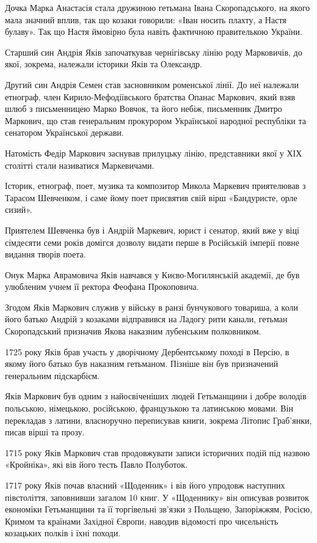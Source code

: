 Дочка Марка Анастасія стала дружиною гетьмана Івана Скоропадського, на якого
мала значний вплив, так що козаки говорили: «Іван носить плахту, а Настя
булаву». Так що Настя ймовірно була навіть фактичною правителькою України. 

Старший син Андрія Яків започаткував чернігівську лінію роду Марковичів, до
якої, зокрема, належали історики Яків та Олександр.

Другий син Андрія Семен став засновником роменської лінії. До неї належали
етнограф, член Кирило-Мефодіївського братства Опанас Маркович, який взяв шлюб з
письменницею Марко Вовчок, та його небіж, письменник Дмитро Маркович, що став
генеральним прокурором Української народної республіки та сенатором Української
держави.

Натомість Федір Маркович заснував прилуцьку лінію, представники якої у ХІХ
столітті стали називатися Маркевичами.

Історик, етнограф, поет, музика та композитор Микола Маркевич приятелював з
Тарасом Шевченком, і саме йому поет присвятив свій вірш «Бандуристе, орле
сизий».

Приятелем Шевченка був і Андрій Маркевич, юрист і сенатор, який вже у віці
сімдесяти семи років домігся дозволу видати перше в Російській імперії повне
видання творів поета.

Онук Марка Аврамовича Яків навчався у Києво-Могилянській академії, де був улюбленим учнем її ректора Феофана Прокоповича.

Згодом Яків Маркович служив у війську в ранзі бунчукового товариша, а коли його
батько Андрій з козаками відправився на Ладогу рити канали, гетьман
Скоропадський призначив Якова наказним лубенським полковником.

1725 року Яків брав участь у дворічному Дербентському поході в Персію, в якому
його батько був наказним гетьманом. Пізніше він був призначений генеральним
підскарбієм.

Яків Маркович був одним з найосвіченіших людей Гетьманщини і добре володів
польською, німецькою, російською, французькою та латинською мовами. Він
перекладав з латини, власноручно переписував книги, зокрема Літопис Граб’янки,
писав вірші та прозу.

1715 року Яків Маркович став продовжувати записи історичних подій під назвою «Кройніка», які вів його тесть Павло Полуботок.

1717 року Яків почав власний «Щоденник» і вів його упродовж наступних
півстоліття, заповнивши загалом 10 книг. У «Щоденнику» він описував розвиток
економіки Гетьманщини та її торгівельні зв’язки з Польщею, Запоріжжям, Росією,
Кримом та країнами Західної Європи, наводив відомості про чисельність козацьких
полків і їхні походи.

